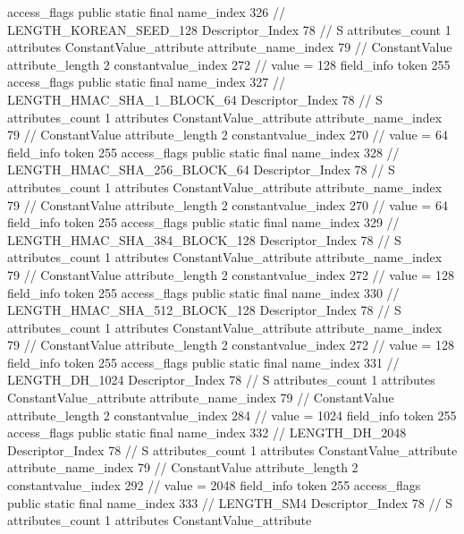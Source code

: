 {{{{{				access_flags	public static final
				name_index	326		// LENGTH_KOREAN_SEED_128
				Descriptor_Index	78		// S
				attributes_count	1
				attributes {
				ConstantValue_attribute {
					attribute_name_index	79		// ConstantValue
					attribute_length	2
					constantvalue_index	272		// value = 128
				}
				}
			}
			field_info {
				token	255
				access_flags	public static final
				name_index	327		// LENGTH_HMAC_SHA_1_BLOCK_64
				Descriptor_Index	78		// S
				attributes_count	1
				attributes {
				ConstantValue_attribute {
					attribute_name_index	79		// ConstantValue
					attribute_length	2
					constantvalue_index	270		// value = 64
				}
				}
			}
			field_info {
				token	255
				access_flags	public static final
				name_index	328		// LENGTH_HMAC_SHA_256_BLOCK_64
				Descriptor_Index	78		// S
				attributes_count	1
				attributes {
				ConstantValue_attribute {
					attribute_name_index	79		// ConstantValue
					attribute_length	2
					constantvalue_index	270		// value = 64
				}
				}
			}
			field_info {
				token	255
				access_flags	public static final
				name_index	329		// LENGTH_HMAC_SHA_384_BLOCK_128
				Descriptor_Index	78		// S
				attributes_count	1
				attributes {
				ConstantValue_attribute {
					attribute_name_index	79		// ConstantValue
					attribute_length	2
					constantvalue_index	272		// value = 128
				}
				}
			}
			field_info {
				token	255
				access_flags	public static final
				name_index	330		// LENGTH_HMAC_SHA_512_BLOCK_128
				Descriptor_Index	78		// S
				attributes_count	1
				attributes {
				ConstantValue_attribute {
					attribute_name_index	79		// ConstantValue
					attribute_length	2
					constantvalue_index	272		// value = 128
				}
				}
			}
			field_info {
				token	255
				access_flags	public static final
				name_index	331		// LENGTH_DH_1024
				Descriptor_Index	78		// S
				attributes_count	1
				attributes {
				ConstantValue_attribute {
					attribute_name_index	79		// ConstantValue
					attribute_length	2
					constantvalue_index	284		// value = 1024
				}
				}
			}
			field_info {
				token	255
				access_flags	public static final
				name_index	332		// LENGTH_DH_2048
				Descriptor_Index	78		// S
				attributes_count	1
				attributes {
				ConstantValue_attribute {
					attribute_name_index	79		// ConstantValue
					attribute_length	2
					constantvalue_index	292		// value = 2048
				}
				}
			}
			field_info {
				token	255
				access_flags	public static final
				name_index	333		// LENGTH_SM4
				Descriptor_Index	78		// S
				attributes_count	1
				attributes {
				ConstantValue_attribute {
}}}}}}}
